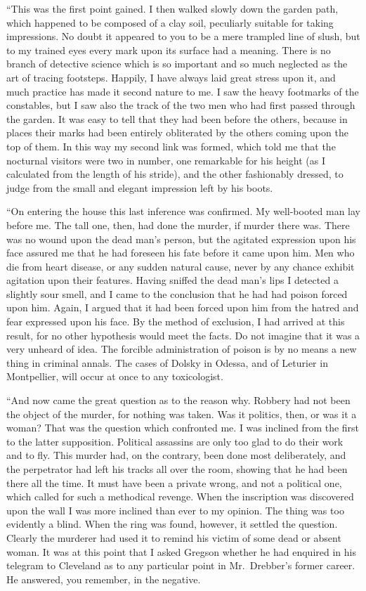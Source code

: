 \documentclass[12pt,english]{book}
\begin{document}
{}``This was the first point gained. I then walked slowly down the
garden path, which happened to be composed of a clay soil, peculiarly
suitable for taking impressions. No doubt it appeared to you to be
a mere trampled line of slush, but to my trained eyes every mark upon
its surface had a meaning. There is no branch of detective science
which is so important and so much neglected as the art of tracing
footsteps. Happily, I have always laid great stress upon it, and much
practice has made it second nature to me. I saw the heavy footmarks
of the constables, but I saw also the track of the two men who had
first passed through the garden. It was easy to tell that they had
been before the others, because in places their marks had been entirely
obliterated by the others coming upon the top of them. In this way
my second link was formed, which told me that the nocturnal visitors
were two in number, one remarkable for his height (as I calculated
from the length of his stride), and the other fashionably dressed,
to judge from the small and elegant impression left by his boots.

{}``On entering the house this last inference was confirmed. My well-booted
man lay before me. The tall one, then, had done the murder, if murder
there was. There was no wound upon the dead man's person, but the
agitated expression upon his face assured me that he had foreseen
his fate before it came upon him. Men who die from heart disease,
or any sudden natural cause, never by any chance exhibit agitation
upon their features. Having sniffed the dead man's lips I detected
a slightly sour smell, and I came to the conclusion that he had had
poison forced upon him. Again, I argued that it had been forced upon
him from the hatred and fear expressed upon his face. By the method
of exclusion, I had arrived at this result, for no other hypothesis
would meet the facts. Do not imagine that it was a very unheard of
idea. The forcible administration of poison is by no means a new thing
in criminal annals. The cases of Dolsky in Odessa, and of Leturier
in Montpellier, will occur at once to any toxicologist.

{}``And now came the great question as to the reason why. Robbery
had not been the object of the murder, for nothing was taken. Was
it politics, then, or was it a woman? That was the question which
confronted me. I was inclined from the first to the latter supposition.
Political assassins are only too glad to do their work and to fly.
This murder had, on the contrary, been done most deliberately, and
the perpetrator had left his tracks all over the room, showing that
he had been there all the time. It must have been a private wrong,
and not a political one, which called for such a methodical revenge.
When the inscription was discovered upon the wall I was more inclined
than ever to my opinion. The thing was too evidently a blind. When
the ring was found, however, it settled the question. Clearly the
murderer had used it to remind his victim of some dead or absent woman.
It was at this point that I asked Gregson whether he had enquired
in his telegram to Cleveland as to any particular point in Mr.\ Drebber's
former career. He answered, you remember, in the negative.
\end{document}
